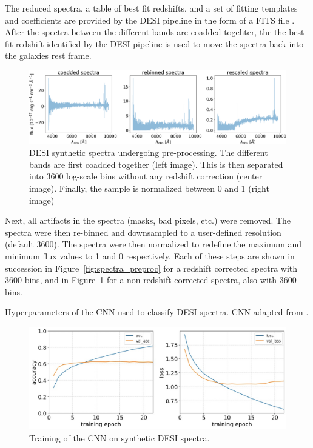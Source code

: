 The reduced spectra, a table of best fit redshifts, and a set of fitting templates and 
coefficients are provided by the DESI pipeline in the form of a FITS file \parencite{Pence2010, Guy2023}.
After the spectra between the different bands are coadded togehter, the 
the best-fit redshift identified by the DESI pipeline is used to move the spectra back into the 
galaxies rest frame. 
\begin{figure}[hb!]
    \centering
    \includegraphics[width=\textwidth]{figures/preprocess/3600_Zrestframe_spectra.png}
    \caption[Spectra Pre-Processing -- Not Redshift Corrected]{DESI synthetic spectra undergoing pre-processing. 
    The different bands are first coadded together (left image). This is then separated 
    into 3600 log-scale bins without any redshift correction (center image). Finally, 
    the sample is normalized between 0 and 1 (right image)}
    \label{fig:sepctra_preproc_nored}
\end{figure} 
Next, all artifacts in the spectra (masks, bad pixels, etc.) were removed. The spectra were then re-binned
and downsampled to a user-defined resolution (default 3600). The spectra were then
normalized to redefine the maximum and minimum flux values to 1 and 0 respectively. 
Each of these steps are shown in succession in Figure~\ref{fig:spectra_preproc} for a 
redshift corrected spectra with 3600 bins, and in Figure~\ref{fig:sepctra_preproc_nored} for 
a non-redshift corrected spectra, also with 3600 bins. 

\begin{table}[t!]
    \small
    \centering
    \sffamily
    
    \caption{Hyperparameters of the CNN used to classify DESI spectra. CNN adapted 
    from \textcite{Sepeku2022}.}
    \label{tab:cnn_hyperparameters}
\end{table}
\begin{figure}[b]
    \centering
    \includegraphics[width=.8\linewidth]{figures/cnn/cnn_training_history.jpg}
    \caption[CNN Training]{Training of the CNN on synthetic DESI spectra.}
    \label{fig:cnn_training}
\end{figure}

